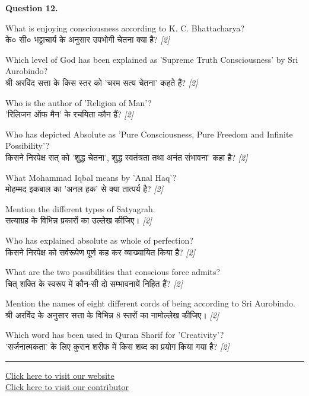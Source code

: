 \documentclass[11pt,a4paper]{article}
\newcommand{\pts}[1]{\hfill \textit{[#1]}}
\begin{document}
\noindent \textbf{Question 12.}
\begin{parts}
  \item What is enjoying consciousness according to K. C. Bhattacharya?\\[1pt]
        के० सी० भट्टाचार्य के अनुसार उपभोगी चेतना क्या है? \pts{2}

  \item Which level of God has been explained as 'Supreme Truth Consciousness' by Sri Aurobindo?\\[1pt]
        श्री अरविंद सत्ता के किस स्तर को 'चरम सत्य चेतना' कहते हैं? \pts{2}

  \item Who is the author of 'Religion of Man'?\\[1pt]
        'रिलिजन ऑफ मैन' के रचयिता कौन हैं? \pts{2}

  \item Who has depicted Absolute as 'Pure Consciousness, Pure Freedom and Infinite Possibility'?\\[1pt]
        किसने निरपेक्ष सत् को 'शुद्ध चेतना', शुद्ध स्वतंत्रता तथा अनंत संभावना' कहा है? \pts{2}

  \item What Mohammad Iqbal means by 'Anal Haq'?\\[1pt]
        मोहम्मद इकबाल का 'अनल हक' से क्या तात्पर्य है? \pts{2}

  \item Mention the different types of Satyagrah.\\[1pt]
        सत्याग्रह के विभिन्न प्रकारों का उल्लेख कीजिए। \pts{2}

  \item Who has explained absolute as whole of perfection?\\[1pt]
        किसने निरपेक्ष को सर्वरूपेण पूर्ण कह कर व्याख्यायित किया है? \pts{2}

  \item What are the two possibilities that conscious force admits?\\[1pt]
        चित् शक्ति के स्वरूप में कौन-सी दो सम्भावनायें निहित हैं? \pts{2}

  \item Mention the names of eight different cords of being according to Sri Aurobindo.\\[1pt]
        श्री अरविंद के अनुसार सत्ता के विभिन्न 8 स्तरों का नामोल्लेख कीजिए। \pts{2}

  \item Which word has been used in Quran Sharif for 'Creativity'?\\[1pt]
        'सर्जनात्मकता' के लिए कुरान शरीफ में किस शब्द का प्रयोग किया गया है? \pts{2}
\end{parts}

\vfill
\rule{\linewidth}{0.4pt}

\begin{center}\small
\href{https://bhu-exam.vercel.app/}{Click here to visit our website}\\[4pt]
\href{https://me-aryan.vercel.app/}{Click here to visit our contributor}
\end{center}
\end{document}
